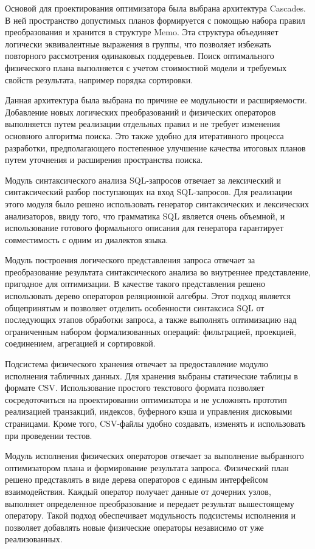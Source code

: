 \documentclass[fontsize=14pt, russian]{scrartcl}
\begin{document}
Основой для проектирования оптимизатора была выбрана архитектура Cascades. В ней
пространство допустимых планов формируется с помощью набора правил
преобразования и хранится в структуре Memo. Эта структура объединяет логически
эквивалентные выражения в группы, что позволяет избежать повторного рассмотрения
одинаковых поддеревьев. Поиск оптимального физического плана выполняется с учетом
стоимостной модели и требуемых свойств результата, например порядка сортировки.

Данная архитектура была выбрана по причине ее модульности и расширяемости.
Добавление новых логических преобразований и физических операторов выполняется
путем реализации отдельных правил и не требует изменения основного алгоритма
поиска. Это также удобно для итеративного процесса разработки, предполагающего
постепенное улучшение качества итоговых планов путем уточнения и расширения
пространства поиска.

Модуль синтаксического анализа SQL-запросов отвечает за лексический и
синтаксический разбор поступающих на вход SQL-запросов. Для реализации этого
модуля было решено использовать генератор синтаксических и лексических
анализаторов, ввиду того, что грамматика SQL является очень объемной, и
использование готового формального описания для генератора гарантирует
совместимость с одним из диалектов языка.

Модуль построения логического представления запроса отвечает за преобразование
результата синтаксического анализа во внутреннее представление, пригодное для
оптимизации. В качестве такого представления решено использовать дерево
операторов реляционной алгебры. Этот подход является общепринятым и позволяет
отделить особенности синтаксиса SQL от последующих этапов обработки запроса, а
также выполнять оптимизацию над ограниченным набором формализованных операций:
фильтрацией, проекцией, соединением, агрегацией и сортировкой.

Подсистема физического хранения отвечает за предоставление модулю исполнения
табличных данных. Для хранения выбраны статические таблицы в формате CSV.
Использование простого текстового формата позволяет сосредоточиться на
проектировании оптимизатора и не усложнять прототип реализацией транзакций,
индексов, буферного кэша и управления дисковыми страницами. Кроме того,
CSV-файлы удобно создавать, изменять и использовать при проведении тестов.

Модуль исполнения физических операторов отвечает за выполнение выбранного
оптимизатором плана и формирование результата запроса. Физический план решено
представлять в виде дерева операторов с единым интерфейсом взаимодействия.
Каждый оператор получает данные от дочерних узлов, выполняет определенное
преобразование и передает результат вышестоящему оператору. Такой подход
обеспечивает модульность подсистемы исполнения и позволяет добавлять новые
физические операторы независимо от уже реализованных.
\end{document}
